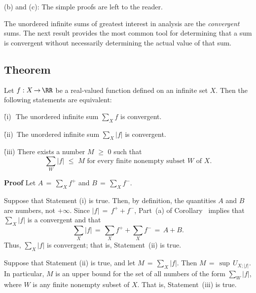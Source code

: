 \V

        (b) and (c): The simple proofs are left to the reader.

\V
\V

        The unordered infinite sums of greatest interest in analysis are the {\em convergent} sums.
    The next result provides the most common tool for determining that a sum is convergent without necessarily determining the actual value of that sum.

\V

            \subsection{\small{\bf Theorem}}
            \label{ThmG20.65}

        Let $f:X \,{\rightarrow}\, {\RR}$ be a real-valued function defined on an infinite set $X$.
    Then the following statements are equivalent:

\V

        \h (i)\,\, The unordered infinite sum ${\sum}_{X} f$ is convergent.

        \h (ii)\, The unordered infinite sum ${\sum}_{X} |f|$ is convergent.

        \h (iii) There exists a number $M\,\,{\geq}\,\,0$ such that
        \begin{displaymath}
        {\sum}_{W} |f|\,\,{\leq}\,\,M \mbox{ for every finite nonempty subset $W$ of $X$}.
        \end{displaymath}

\V

        {\bf Proof} Let $A \,=\, {\sum}_{X} f^{+}$ and $B \,=\, {\sum}_{X} f^{-}$.

\V

        Suppose that Statement (i) is true. Then, by definition, the quantities $A$ and $B$ are numbers, not $+{\infty}$.
    Since $|f| \,=\, f^{+}+f^{-}$, Part~(a) of Corollary~ implies that ${\sum}_{X} |f|$ is a convergent and that
        \begin{displaymath}
       {\sum}_{X} |f| \,=\, {\sum}_{X} f^{+} + {\sum}_{X} f^{-} \,=\, A+B.
        \end{displaymath}
    Thus, ${\sum}_{X} |f|$ is convergent; that is, Statement~(ii) is true.

        Suppose that Statement (ii) is true, and let $M \,=\, {\sum}_{X} |f|$.
    Then $M \,=\, {\sup}\,U_{X;|f|}$.
    In particular, $M$ is an upper bound for the set of all numbers of the form ${\sum}_{W} |f|$, where $W$ is any finite nonempty subset of $X$.
    That is, Statement~(iii) is true.

